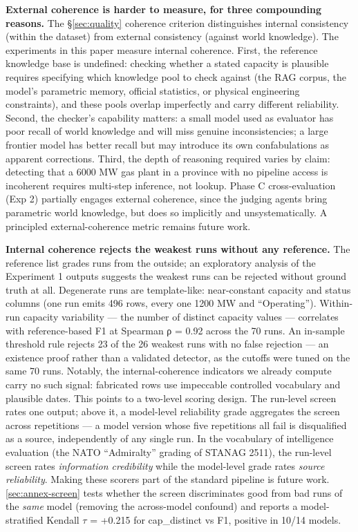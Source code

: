 \documentclass[a4paper,11pt]{article}
\begin{document}
\textbf{External coherence is harder to measure, for three compounding
reasons.} The §\ref{sec:quality} coherence criterion distinguishes
internal consistency (within the dataset) from external consistency
(against world knowledge). The experiments in this paper measure
internal coherence. First, the reference knowledge base is undefined:
checking whether a stated capacity is plausible requires specifying
which knowledge pool to check against (the RAG corpus, the model's
parametric memory, official statistics, or physical engineering
constraints), and these pools overlap imperfectly and carry different
reliability. Second, the checker's capability matters: a small model
used as evaluator has poor recall of world knowledge and will miss
genuine inconsistencies; a large frontier model has better recall but
may introduce its own confabulations as apparent corrections. Third, the
depth of reasoning required varies by claim: detecting that a 6000 MW
gas plant in a province with no pipeline access is incoherent requires
multi-step inference, not lookup. Phase C cross-evaluation (Exp 2)
partially engages external coherence, since the judging agents bring
parametric world knowledge, but does so implicitly and unsystematically.
A principled external-coherence metric remains future work.

\textbf{Internal coherence rejects the weakest runs without any
reference.} The reference list grades runs from the outside; an
exploratory analysis of the Experiment 1 outputs suggests the weakest
runs can be rejected without ground truth at all. Degenerate runs are
template-like: near-constant capacity and status columns (one run emits
496 rows, every one 1200 MW and ``Operating''). Within-run capacity
variability --- the number of distinct capacity values --- correlates
with reference-based F1 at Spearman ρ = 0.92 across the 70 runs. An
in-sample threshold rule rejects 23 of the 26 weakest runs with no false
rejection --- an existence proof rather than a validated detector, as
the cutoffs were tuned on the same 70 runs. Notably, the
internal-coherence indicators we already compute carry no such signal:
fabricated rows use impeccable controlled vocabulary and plausible
dates. This points to a two-level scoring design. The run-level screen
rates one output; above it, a model-level reliability grade aggregates
the screen across repetitions --- a model version whose five repetitions
all fail is disqualified as a source, independently of any single run.
In the vocabulary of intelligence evaluation (the NATO ``Admiralty''
grading of STANAG 2511), the run-level screen rates \emph{information
credibility} while the model-level grade rates \emph{source
reliability}. Making these scorers part of the standard pipeline is
future work. \ref{sec:annex-screen} tests whether the screen
discriminates good from bad runs of the \emph{same} model (removing the
across-model confound) and reports a model-stratified Kendall \(\tau\) =
+0.215 for cap\_distinct vs F1, positive in 10/14 models.
\end{document}
